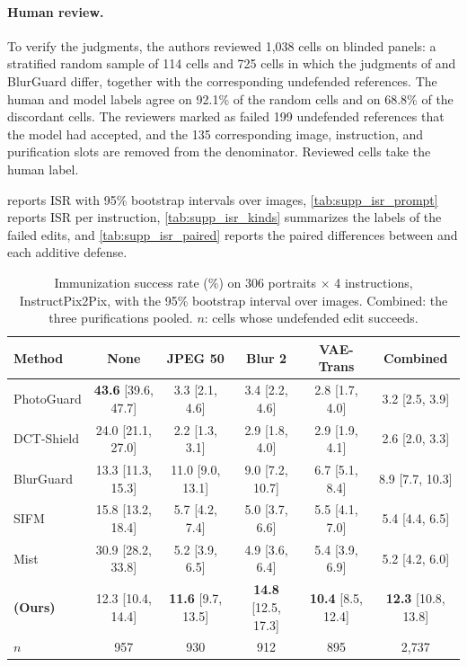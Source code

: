 \paragraph{Human review.} To verify the judgments, the authors reviewed 1{,}038 cells on blinded panels: a stratified random sample of 114 cells and 725 cells in which the judgments of \capg{} and BlurGuard differ, together with the corresponding undefended references. The human and model labels agree on 92.1\% of the random cells and on 68.8\% of the discordant cells. The reviewers marked as failed 199 undefended references that the model had accepted, and the 135 corresponding image, instruction, and purification slots are removed from the denominator. Reviewed cells take the human label.

 reports ISR with 95\% bootstrap intervals over images, \cref{tab:supp_isr_prompt} reports ISR per instruction, \cref{tab:supp_isr_kinds} summarizes the labels of the failed edits, and \cref{tab:supp_isr_paired} reports the paired differences between \capg{} and each additive defense.

\begin{table}[t]
  \centering
  \footnotesize
  \setlength{\tabcolsep}{4pt}
  \caption{Immunization success rate (\%) on 306 portraits $\times$ 4 instructions, InstructPix2Pix, with the 95\% bootstrap interval over images. Combined: the three purifications pooled. $n$: cells whose undefended edit succeeds.}
  \label{tab:supp_isr_full}
  \begin{tabular}{@{}l ccccc@{}}
    \toprule
    Method & None & JPEG 50 & Blur 2 & VAE-Trans & Combined \\
    \midrule
    PhotoGuard & \textbf{43.6} [39.6, 47.7] & 3.3 [2.1, 4.6] & 3.4 [2.2, 4.6] & 2.8 [1.7, 4.0] & 3.2 [2.5, 3.9] \\
    DCT-Shield & 24.0 [21.1, 27.0] & 2.2 [1.3, 3.1] & 2.9 [1.8, 4.0] & 2.9 [1.9, 4.1] & 2.6 [2.0, 3.3] \\
    BlurGuard & 13.3 [11.3, 15.3] & 11.0 [9.0, 13.1] & 9.0 [7.2, 10.7] & 6.7 [5.1, 8.4] & 8.9 [7.7, 10.3] \\
    SIFM & 15.8 [13.2, 18.4] & 5.7 [4.2, 7.4] & 5.0 [3.7, 6.6] & 5.5 [4.1, 7.0] & 5.4 [4.4, 6.5] \\
    Mist & 30.9 [28.2, 33.8] & 5.2 [3.9, 6.5] & 4.9 [3.6, 6.4] & 5.4 [3.9, 6.9] & 5.2 [4.2, 6.0] \\
    \midrule
    \rowcolor{oursrow}
    \textbf{\capg{} (Ours)} & 12.3 [10.4, 14.4] & \textbf{11.6} [9.7, 13.5] & \textbf{14.8} [12.5, 17.3] & \textbf{10.4} [8.5, 12.4] & \textbf{12.3} [10.8, 13.8] \\
    \midrule
    $n$ & 957 & 930 & 912 & 895 & 2{,}737 \\
    \bottomrule
  \end{tabular}
\end{table}

